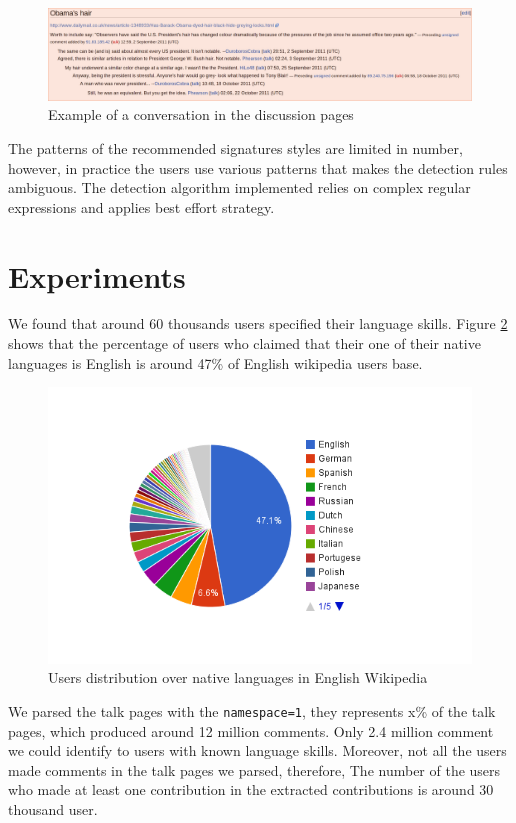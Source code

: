 \documentclass[11pt]{article}
\begin{document}
\begin{figure}[Htp]
\centering
\includegraphics[scale=0.285]{obama.png}
\caption{Example of a conversation in the discussion pages}
\label{obama}
\end{figure}

The patterns of the recommended signatures styles are limited in number, however, in practice the users use various patterns that makes the detection rules ambiguous. The detection algorithm implemented relies on complex regular expressions and applies best effort strategy.



\section{Experiments}
We found that around 60 thousands users specified their language skills. Figure \ref{native_dist} shows that the percentage of users who claimed that their one of their native languages is English is around 47\% of English wikipedia users base. 
\begin{figure}[htp]
\centering
\includegraphics[scale=0.5]{chart_4.png}
\caption{Users distribution over native languages in English Wikipedia}
\label{native_dist}
\end{figure}

We parsed the talk pages with the \verb+namespace=1+, they represents x\% of the talk pages, which produced around 12 million comments. Only 2.4 million comment we could identify to users with known language skills. Moreover, not all the users made comments in the talk pages we parsed, therefore, The number of the users who made at least one contribution in the extracted contributions is around 30 thousand user.
\end{document}
